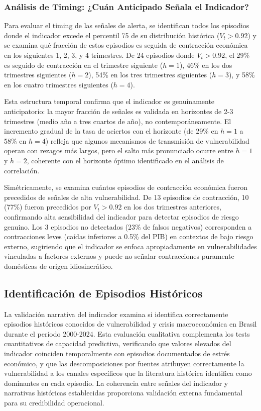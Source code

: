 \documentclass[3p,11pt,draft,natbib=false]{elsarticle}
\begin{document}
\subsubsection{Análisis de Timing: ¿Cuán Anticipado Señala el Indicador?}

Para evaluar el timing de las señales de alerta, se identifican todos los episodios donde el indicador excede el percentil 75 de su distribución histórica ($V_t > 0.92$) y se examina qué fracción de estos episodios es seguida de contracción económica en los siguientes 1, 2, 3, y 4 trimestres. De 24 episodios donde $V_t > 0.92$, el 29\% es seguido de contracción en el trimestre siguiente ($h=1$), 46\% en los dos trimestres siguientes ($h=2$), 54\% en los tres trimestres siguientes ($h=3$), y 58\% en los cuatro trimestres siguientes ($h=4$).

Esta estructura temporal confirma que el indicador es genuinamente anticipatorio: la mayor fracción de señales es validada en horizontes de 2-3 trimestres (medio año a tres cuartos de año), no contemporáneamente. El incremento gradual de la tasa de aciertos con el horizonte (de 29\% en $h=1$ a 58\% en $h=4$) refleja que algunos mecanismos de transmisión de vulnerabilidad operan con rezagos más largos, pero el salto más pronunciado ocurre entre $h=1$ y $h=2$, coherente con el horizonte óptimo identificado en el análisis de correlación.

Simétricamente, se examina cuántos episodios de contracción económica fueron precedidos de señales de alta vulnerabilidad. De 13 episodios de contracción, 10 (77\%) fueron precedidos por $V_t > 0.92$ en los dos trimestres anteriores, confirmando alta sensibilidad del indicador para detectar episodios de riesgo genuino. Los 3 episodios no detectados (23\% de falsos negativos) corresponden a contracciones leves (caídas inferiores a 0.5\% del PIB) en contextos de bajo riesgo externo, sugiriendo que el indicador se enfoca apropiadamente en vulnerabilidades vinculadas a factores externos y puede no señalar contracciones puramente domésticas de origen idiosincrático.

\subsection{Identificación de Episodios Históricos}
\label{sec:episodios}

La validación narrativa del indicador examina si identifica correctamente episodios históricos conocidos de vulnerabilidad y crisis macroeconómica en Brasil durante el período 2000-2024. Esta evaluación cualitativa complementa los tests cuantitativos de capacidad predictiva, verificando que valores elevados del indicador coinciden temporalmente con episodios documentados de estrés económico, y que las descomposiciones por fuentes atribuyen correctamente la vulnerabilidad a los canales específicos que la literatura histórica identifica como dominantes en cada episodio. La coherencia entre señales del indicador y narrativas históricas establecidas proporciona validación externa fundamental para su credibilidad operacional.
\end{document}
